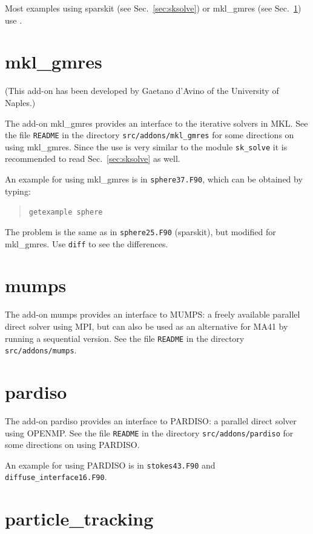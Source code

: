 Most examples using sparskit (see Sec.~\ref{sec:sksolve}) or
mkl\_gmres (see Sec.~\ref{sec:mklgmres})
use \mbox{}.

\section{mkl\_gmres}
\label{sec:mklgmres}

(This add-on has been developed by Gaetano d'Avino of the University of
Naples.)

The add-on mkl\_gmres provides an interface to the iterative solvers in MKL.
See the file \texttt{README} in the directory \texttt{src/addons/mkl\_gmres}
for some directions on using mkl\_gmres. Since the use is very similar to
the module \texttt{sk\_solve} it is recommended to read
Sec.~\ref{sec:sksolve} as well.

An example for using mkl\_gmres is in
\texttt{sphere37.F90}, which can be obtained by typing:
\begin{quote}
   \texttt{getexample sphere}
\end{quote}
The problem is
the same as in \texttt{sphere25.F90} (sparskit), but modified for
mkl\_gmres. Use \texttt{diff} to see the differences.

\section{mumps}
\label{sec:mumps}

The add-on mumps provides an interface to MUMPS: a freely available
parallel direct solver using MPI, but can also be used as an alternative
for MA41 by running a sequential version.
See the file \texttt{README} in the directory \texttt{src/addons/mumps}.

\section{pardiso}
\label{sec:pardiso}

The add-on pardiso provides an interface to PARDISO: a
parallel direct solver using OPENMP.
See the file \texttt{README} in the directory \texttt{src/addons/pardiso} for some
directions on using PARDISO.

An example for using PARDISO is in
\texttt{stokes43.F90} and \texttt{diffuse\_interface16.F90}.

\section{particle\_tracking}
\label{sec:particletrackingaddon}

